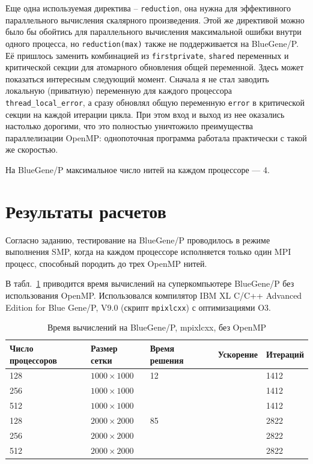 \documentclass[12pt,notitlepage,oneside]{extarticle}
\begin{document}
Еще одна используемая директива -- \texttt{reduction}, она нужна для
эффективного параллельного вычисления скалярного произведения. Этой же
директивой можно было бы обойтись для параллельного вычисления максимальной
ошибки внутри одного процесса, но \texttt{reduction(max)} также не
поддерживается на BlueGene/P. Её пришлось заменить комбинацией из
\texttt{firstprivate}, \texttt{shared} переменных и критической секции для
атомарного обновления общей переменной. Здесь может показаться интересным
следующий момент. Сначала я не стал заводить локальную (приватную) переменную
для каждого процессора \texttt{thread\_local\_error}, а сразу обновлял общую
переменную \texttt{error} в критической секции на каждой итерации цикла.
При этом вход и выход из нее оказались настолько дорогими, что это полностью
уничтожило преимущества параллелизации OpenMP: однопоточная программа работала
практически с такой же скоростью.

На BlueGene/P максимальное число нитей на каждом процессоре --- 4.

\section{Результаты расчетов}
Согласно заданию, тестирование на BlueGene/P проводилось в режиме выполнения
SMP, когда на каждом процессоре исполняется только один MPI процесс, способный
породить до трех OpenMP нитей.

В табл.~\ref{bg:table} приводится время вычислений на суперкомпьютере BlueGene/P
без использования OpenMP. Использовался компилятор IBM XL C/C++ Advanced Edition
for Blue Gene/P, V9.0 (скрипт \texttt{mpixlcxx}) с оптимизациями O3.

\begin{table}[h]
\centering
\caption{Время вычислений на BlueGene/P, mpixlcxx, без OpenMP}
\label{bg:table}
\begin{tabular}{|l|l|l|l|l|}
\textbf{Число процессоров} & \textbf{Размер сетки} & \textbf{Время решения} & \textbf{Ускорение}      & \textbf{Итераций}        \\ \hline
128                        & $1000 \times 1000 $        & 12                     &                    & 1412                     \\
256                        & $1000 \times 1000 $        &                        &                    & 1412                         \\
512                        & $1000 \times 1000 $        &                        &                    & 1412                         \\ \hline
128                        & $2000 \times 2000 $        & 85                     &                    & 2822                     \\
256                        & $2000 \times 2000 $        &                        &                    & 2822                         \\
512                        & $2000 \times 2000 $        &                        &                    & 2822
\end{tabular}
\end{table}
\end{document}

